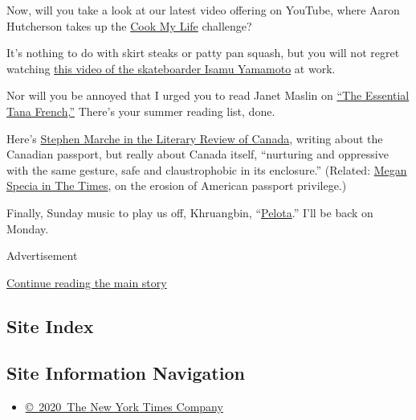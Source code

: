 Now, will you take a look at our latest video offering on YouTube, where
Aaron Hutcherson takes up the
\href{https://www.youtube.com/watch?v=5ybS5epdjZk}{Cook My Life}
challenge?

It's nothing to do with skirt steaks or patty pan squash, but you will
not regret watching
\href{https://www.youtube.com/watch?v=x3ici7djACc\&t=15s}{this video of
the skateboarder Isamu Yamamoto} at work.

Nor will you be annoyed that I urged you to read Janet Maslin on
\href{https://www.nytimes.com/2020/07/29/books/the-essential-tana-french.html}{``The
Essential Tana
French}.\href{https://www.nytimes.com/2020/07/29/books/the-essential-tana-french.html}{''}
There's your summer reading list, done.

Here's
\href{https://reviewcanada.ca/magazine/2020/07/the-passport/}{Stephen
Marche in the Literary Review of Canada}, writing about the Canadian
passport, but really about Canada itself, ``nurturing and oppressive
with the same gesture, safe and claustrophobic in its enclosure.''
(Related:
\href{https://www.nytimes.com/2020/07/07/world/europe/american-passport-privilege-coronavirus.html}{Megan
Specia in The Times}, on the erosion of American passport privilege.)

Finally, Sunday music to play us off, Khruangbin,
``\href{https://youtu.be/UULIfPLMuDw}{Pelota}.'' I'll be back on Monday.

Advertisement

\protect\hyperlink{after-bottom}{Continue reading the main story}

\hypertarget{site-index}{%
\subsection{Site Index}\label{site-index}}

\hypertarget{site-information-navigation}{%
\subsection{Site Information
Navigation}\label{site-information-navigation}}

\begin{itemize}
\tightlist
\item
  \href{https://help.nytimes.com/hc/en-us/articles/115014792127-Copyright-notice}{©~2020~The
  New York Times Company}
\end{itemize}

